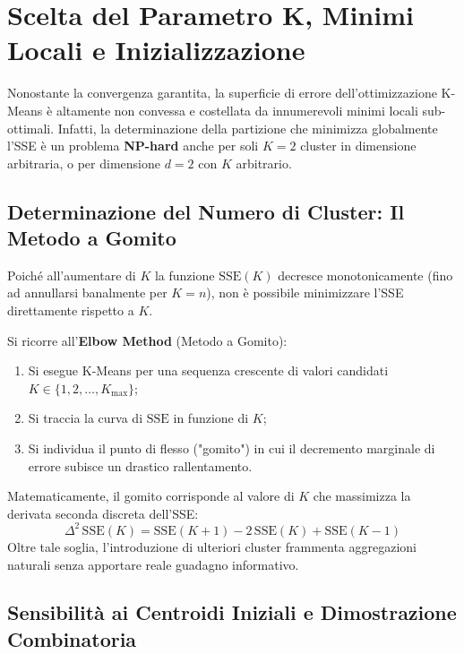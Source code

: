 \section{Scelta del Parametro K, Minimi Locali e Inizializzazione}
\label{sec:dm-kmeans-k-choice-local-minima}

Nonostante la convergenza garantita, la superficie di errore dell'ottimizzazione K-Means è altamente non convessa e costellata da innumerevoli minimi locali sub-ottimali. Infatti, la determinazione della partizione che minimizza globalmente l'SSE è un problema \textbf{NP-hard} anche per soli $K = 2$ cluster in dimensione arbitraria, o per dimensione $d = 2$ con $K$ arbitrario.

\subsection{Determinazione del Numero di Cluster: Il Metodo a Gomito}

Poiché all'aumentare di $K$ la funzione $\mathrm{SSE}(K)$ decresce monotonicamente (fino ad annullarsi banalmente per $K = n$), non è possibile minimizzare l'SSE direttamente rispetto a $K$. 

Si ricorre all'\textbf{Elbow Method} (Metodo a Gomito):
\begin{enumerate}
    \item Si esegue K-Means per una sequenza crescente di valori candidati $K \in \{1, 2, \dots, K_{\max}\}$;
    \item Si traccia la curva di $\mathrm{SSE}$ in funzione di $K$;
    \item Si individua il punto di flesso ("gomito") in cui il decremento marginale di errore subisce un drastico rallentamento.
\end{enumerate}
Matematicamente, il gomito corrisponde al valore di $K$ che massimizza la derivata seconda discreta dell'SSE:
\begin{equation}
    \Delta^2 \, \mathrm{SSE}(K) = \mathrm{SSE}(K+1) - 2 \, \mathrm{SSE}(K) + \mathrm{SSE}(K-1)
\end{equation}
Oltre tale soglia, l'introduzione di ulteriori cluster frammenta aggregazioni naturali senza apportare reale guadagno informativo.

\subsection{Sensibilità ai Centroidi Iniziali e Dimostrazione Combinatoria}

